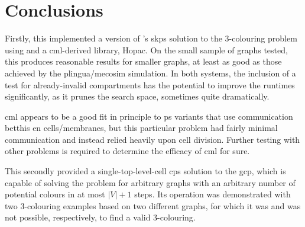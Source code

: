 




\section{\label{sec:gcol:conc}Conclusions}
Firstly, this  implemented a version of \citeauthor{Gheorghe2013}'s \gls{skps} solution to the 3-colouring problem using \fsharp{} and a \gls{cml}-derived library, Hopac.   On the small sample of graphs tested, this produces reasonable results for smaller graphs, at least as good as those achieved by the \gls{plingua}/\gls{mecosim} simulation.  In both systems, the inclusion of a test for already-invalid compartments has the potential to improve the runtimes significantly, as it prunes the search space, sometimes quite dramatically.

\gls{cml} appears to be a good fit in principle to \gls{ps} variants that use communication betthis en cells/membranes, but this particular problem had fairly minimal communication and instead relied heavily upon cell division.  Further testing with other problems is required to determine the efficacy of \gls{cml} for sure.

This  secondly provided a single-top-level-cell \gls{cps} solution to the \gls{gcp}, which is capable of solving the problem for arbitrary graphs with an arbitrary number of potential colours in at most \(|V| + 1\) steps.  Its operation was demonstrated with two 3-colouring examples based on two different graphs, for which it was and was not possible, respectively, to find a valid 3-colouring.
